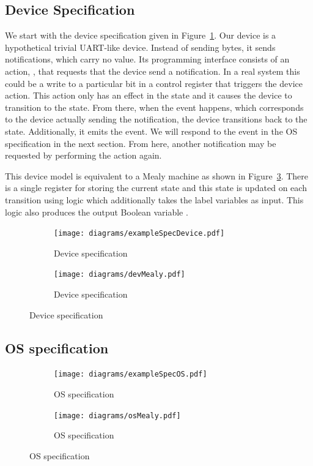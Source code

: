 \subsection{Device Specification}

We start with the device specification given in Figure~\ref{fig:dev_spec}. Our device is a hypothetical trivial UART-like device. Instead of sending bytes, it sends notifications, which carry no value. Its programming interface consists of an action, , that requests that the device send a notification. In a real system this could be a write to a particular bit in a control register that triggers the device action. This action only has an effect in the  state and it causes the device to transition to the  state. From there, when the  event happens, which corresponds to the device actually sending the notification, the device transitions back to the  state. Additionally, it emits the  event. We will respond to the  event in the OS specification in the next section. From here, another notification may be requested by performing the  action again.

This device model is equivalent to a Mealy machine as shown in Figure~\ref{fig:dev_spec_mealy}. There is a single register for storing the current state and this state is updated on each transition using logic which additionally takes the label variables as input. This logic also produces the output Boolean variable .

\begin{figure}
\centering
\begin{subfigure}[t]{0.47\textwidth}
\texttt{[image: diagrams/exampleSpecDevice.pdf]}
\caption{Device specification}
\label{fig:dev_spec}
\end{subfigure}
\hfill
\begin{subfigure}[t]{0.47\textwidth}
\texttt{[image: diagrams/devMealy.pdf]}
\caption{Device specification}
\label{fig:dev_spec_mealy}
\end{subfigure}
\end{figure}

\subsection{OS specification}

\begin{figure}
\centering
\begin{subfigure}[t]{0.47\textwidth}
\texttt{[image: diagrams/exampleSpecOS.pdf]}
\caption{OS specification}
\label{fig:os_spec}
\end{subfigure}
\hfill
\begin{subfigure}[t]{0.47\textwidth}
\centering
\texttt{[image: diagrams/osMealy.pdf]}
\caption{OS specification}
\label{fig:os_spec_mealy}
\end{subfigure}
\end{figure}

